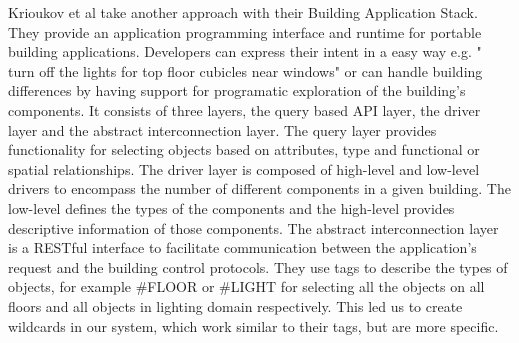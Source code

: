 Krioukov et al \cite{Krioukov12} take another approach with their Building Application Stack. They provide an application programming interface and runtime for portable building applications. Developers can express their intent in a easy way e.g. " turn off the lights
for top floor cubicles near windows" or can handle building differences by having support for programatic exploration of the building's components. It consists of three layers, the query based API layer, the driver layer and the abstract interconnection layer. 
The query layer provides functionality for selecting objects based on attributes, type and functional or spatial relationships. The driver layer is composed of high-level and low-level drivers to encompass the number of different components in a given building. The low-level defines the types of the components and the high-level provides descriptive information of those components. The abstract interconnection layer is a RESTful interface to facilitate communication between the application's request and the building control protocols. They use tags to describe the types of objects, for example \#FLOOR or \#LIGHT for selecting all the objects on all floors and all objects in lighting domain respectively. This led us to create wildcards in our system, which work similar to their tags, but are more specific. 
